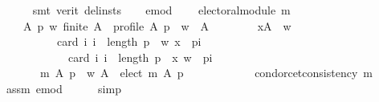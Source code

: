 \begin{isabellebody}
\ \ \ \ \isamarkupfalse%
\ {\isacharparenleft}{\kern0pt}smt\ {\isacharparenleft}{\kern0pt}verit{\isacharcomma}{\kern0pt}\ del{\isacharunderscore}{\kern0pt}insts{\isacharparenright}{\kern0pt}{\isacharparenright}{\kern0pt}\isanewline
\ \ \isamarkupfalse%
\ e{\isacharunderscore}{\kern0pt}mod{\isacharcolon}{\kern0pt}\isanewline
\ \ \ \ {\isachardoublequoteopen}electoral{\isacharunderscore}{\kern0pt}module\ m{\isachardoublequoteclose}\isanewline
\ \ \isamarkupfalse%
\isanewline
\ \ \ \ {\isachardoublequoteopen}{\isasymforall}A\ p\ w{\isachardot}{\kern0pt}\ finite\ A\ {\isasymand}\ profile\ A\ p\ {\isasymand}\ w\ {\isasymin}\ A\ {\isasymand}\isanewline
\ \ \ \ \ \ \ {\isacharparenleft}{\kern0pt}{\isasymforall}x{\isasymin}A\ {\isacharminus}{\kern0pt}\ {\isacharbraceleft}{\kern0pt}w{\isacharbraceright}{\kern0pt}{\isachardot}{\kern0pt}\isanewline
\ \ \ \ \ \ \ \ \ \ card\ {\isacharbraceleft}{\kern0pt}i{\isachardot}{\kern0pt}\ i\ {\isacharless}{\kern0pt}\ length\ p\ {\isasymand}\ {\isacharparenleft}{\kern0pt}w{\isacharcomma}{\kern0pt}\ x{\isacharparenright}{\kern0pt}\ {\isasymin}\ {\isacharparenleft}{\kern0pt}p{\isacharbang}{\kern0pt}i{\isacharparenright}{\kern0pt}{\isacharbraceright}{\kern0pt}\ {\isacharless}{\kern0pt}\isanewline
\ \ \ \ \ \ \ \ \ \ \ \ card\ {\isacharbraceleft}{\kern0pt}i{\isachardot}{\kern0pt}\ i\ {\isacharless}{\kern0pt}\ length\ p\ {\isasymand}\ {\isacharparenleft}{\kern0pt}x{\isacharcomma}{\kern0pt}\ w{\isacharparenright}{\kern0pt}\ {\isasymin}\ {\isacharparenleft}{\kern0pt}p{\isacharbang}{\kern0pt}i{\isacharparenright}{\kern0pt}{\isacharbraceright}{\kern0pt}{\isacharparenright}{\kern0pt}\ {\isasymlongrightarrow}\isanewline
\ \ \ \ \ \ \ m\ A\ p\ {\isacharequal}{\kern0pt}\ {\isacharparenleft}{\kern0pt}{\isacharbraceleft}{\kern0pt}w{\isacharbraceright}{\kern0pt}{\isacharcomma}{\kern0pt}\ A\ {\isacharminus}{\kern0pt}\ elect\ m\ A\ p{\isacharcomma}{\kern0pt}\ {\isacharbraceleft}{\kern0pt}{\isacharbraceright}{\kern0pt}{\isacharparenright}{\kern0pt}\ {\isasymLongrightarrow}\isanewline
\ \ \ \ \ \ \ \ \ \ condorcet{\isacharunderscore}{\kern0pt}consistency\ m{\isachardoublequoteclose}\isanewline
\ \ \ \ \isamarkupfalse%
\ assm{}\ e{\isacharunderscore}{\kern0pt}mod\isanewline
\ \ \ \ \isamarkupfalse%
\ simp\isanewline
{}\isamarkupfalse%
%
\endisatagproof
{\isafoldproof}%
%
\isadelimproof
%
\endisadelimproof
%
\isadelimdocument
%
\endisadelimdocument
%
\isatagdocument
%
\isamarkuptrue%
%
\endisatagdocument

\end{isabellebody}

